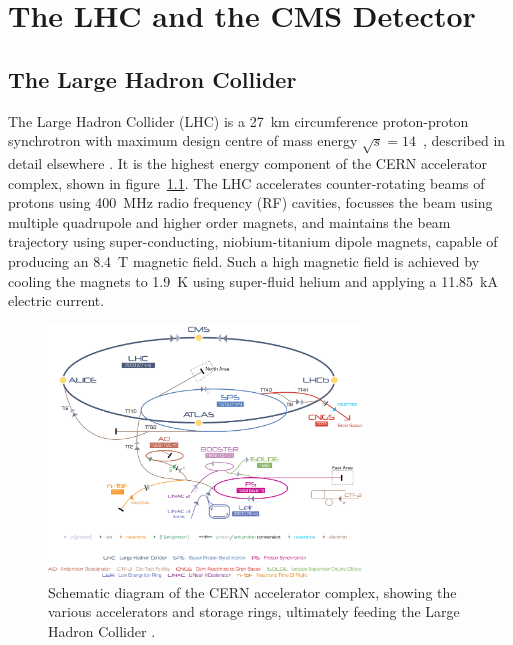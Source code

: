 \chapter{The LHC and the CMS Detector}
\label{ch:detector}

\ifpdf
    \graphicspath{{Chapter3/Figs/Raster/}{Chapter3/Figs/PDF/}{Chapter3/Figs/}}
\else
    \graphicspath{{Chapter3/Figs/Vector/}{Chapter3/Figs/}}
\fi


\section{The Large Hadron Collider}  %
\label{sec:detector_lhc}

The Large Hadron Collider (LHC) is a 27~km circumference proton-proton 
synchrotron with maximum design centre of mass energy
$\sqrt{s} = 14$~\tev, described in detail elsewhere \cite{Evans:2008zzb}. It
is the highest energy component of the CERN accelerator
complex, shown in figure~\ref{fig:cern_acc_complex}. The LHC
accelerates counter-rotating beams of protons using 400~MHz radio frequency
(RF) cavities, focusses the beam using multiple quadrupole and higher order magnets,
and maintains the beam trajectory using super-conducting, niobium-titanium 
dipole magnets, capable of producing an 8.4~T magnetic field. Such a high 
magnetic field is achieved by cooling the magnets to 1.9~K using super-fluid 
helium and applying a 11.85~kA electric current.


\begin{figure}[ht!]
\centering
\includegraphics[width=0.74\textwidth]{Figs/machine/Cern-Accelerator-Complex.jpg}
\caption{Schematic diagram of the CERN accelerator complex, showing the various
accelerators and storage rings, ultimately feeding the Large Hadron Collider
\cite{acc_complex}.}
\label{fig:cern_acc_complex}
\end{figure}

